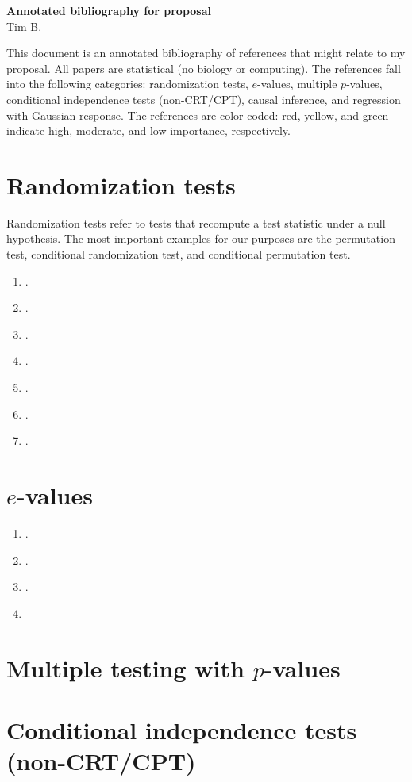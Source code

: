 \documentclass[12pt]{article}
\newcommand{\red}[1]{\textcolor{red}{#1}}
\newcommand{\green}[1]{\textcolor{ForestGreen}{#1}}
\newcommand{\yellow}[1]{\textcolor{YellowOrange}{#1}}
\begin{document}
\begin{center}
\textbf{Annotated bibliography for proposal} \\
Tim B.
\end{center}

This document is an annotated bibliography of references that might relate to my proposal. All papers are statistical (no biology or computing). The references fall into the following categories: randomization tests, $e$-values, multiple $p$-values, conditional independence tests (non-CRT/CPT), causal inference, and regression with Gaussian response. The references are color-coded: red, yellow, and green indicate high, moderate, and low importance, respectively.

\section{Randomization tests}

Randomization tests refer to tests that recompute a test statistic under a null hypothesis. The most important examples for our purposes are the permutation test, conditional randomization test, and conditional permutation test.

\begin{enumerate}
\item \red{\cite{Katsevich2020b}}.
\item \red{\cite{Berrett2020}}.
\item \red{\cite{Li2021}}.
\item \yellow{\cite{Zhang2021}}.
\item \yellow{\cite{Javanmard2021}}.
\item \yellow{\cite{Zhong2021}}.
\item \green{\cite{Dobriban2021}}.
\end{enumerate}

\section{$e$-values}

\begin{enumerate}
\item \red{\cite{Shafer2021}}.
\item \red{\cite{Wang2020b}}.
\item \red{\cite{Vovk2020}}.
\item 
\end{enumerate}

\section{Multiple testing with $p$-values}

\section{Conditional independence tests (non-CRT/CPT)}

\printbibliography
\end{document}

